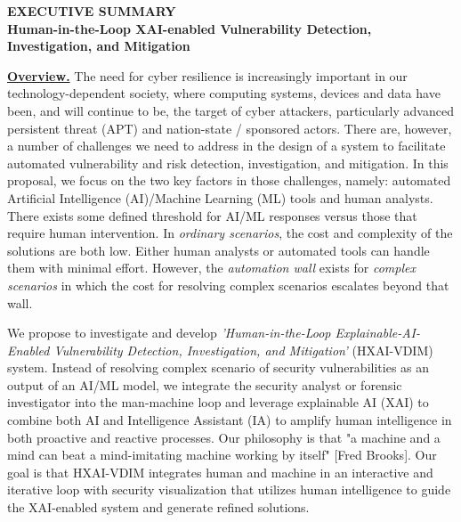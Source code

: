 \documentclass[11pt]{article}
\begin{document}

\begin{center}
  {\bf EXECUTIVE SUMMARY\\ Human-in-the-Loop XAI-enabled Vulnerability Detection, Investigation, and Mitigation}
\end{center}

\noindent \underline{\bf Overview.} 
The need for cyber resilience is increasingly important in our technology-dependent society, where computing systems, devices and data have been, and will continue to be, the target of cyber attackers, particularly advanced persistent threat (APT) and nation-state / sponsored actors. There are, however, a number of challenges we need to address in the design of a system to facilitate automated vulnerability and risk detection, investigation, and mitigation. In this proposal, we focus on the two key factors in those challenges, namely: automated Artificial Intelligence (AI)/Machine Learning (ML) tools and human analysts. There exists some defined threshold for AI/ML responses versus those that require human intervention. In \emph{ordinary scenarios}, the cost and complexity of the solutions are both low. Either human analysts or automated tools can handle them with minimal effort. However, the {\em automation wall} exists for \emph{complex scenarios} in which the cost for resolving complex scenarios escalates beyond that wall.

We propose to investigate and develop {\em 'Human-in-the-Loop Explainable-AI-Enabled Vulnerability Detection, Investigation, and Mitigation’} (HXAI-VDIM) system. Instead of resolving complex scenario of security vulnerabilities as an output of an AI/ML model, we integrate the security analyst or forensic investigator into the man-machine loop and leverage explainable AI (XAI) to combine both AI and Intelligence Assistant (IA) to amplify human intelligence in both proactive and reactive processes. Our philosophy is that "a machine and a mind can beat a mind-imitating machine working by itself" [Fred Brooks]. Our goal is that HXAI-VDIM integrates human and machine in an interactive and iterative loop with security visualization that utilizes human intelligence to guide the XAI-enabled system and generate refined solutions.
\end{document}
